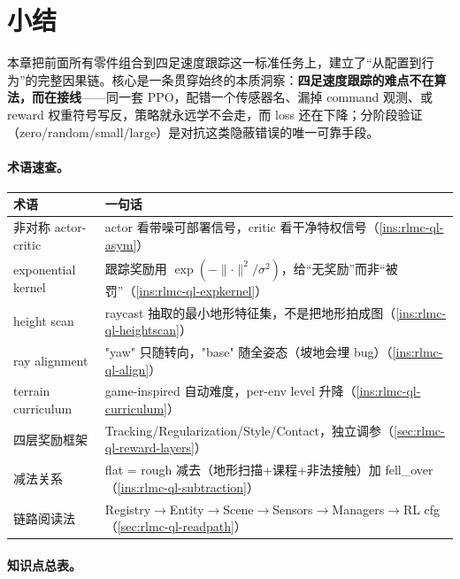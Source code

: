 \section{小结}
\label{sec:rlmc-ql-summary}

本章把前面所有零件组合到四足速度跟踪这一标准任务上，建立了“从配置到行为”的完整因果链。核心是一条贯穿始终的本质洞察：\textbf{四足速度跟踪的难点不在算法，而在接线}——同一套 PPO，配错一个传感器名、漏掉 command 观测、或 reward 权重符号写反，策略就永远学不会走，而 loss 还在下降；分阶段验证（zero/random/small/large）是对抗这类隐蔽错误的唯一可靠手段。

\paragraph{术语速查。}

\begin{center}
\small
\begin{tabular}{@{}ll@{}}
\toprule
术语 & 一句话 \\
\midrule
非对称 actor-critic & actor 看带噪可部署信号，critic 看干净特权信号（\cref{ins:rlmc-ql-asym}） \\
exponential kernel & 跟踪奖励用 $\exp(-\lVert\cdot\rVert^2/\sigma^2)$，给“无奖励”而非“被罚”（\cref{ins:rlmc-ql-expkernel}） \\
height scan & raycast 抽取的最小地形特征集，不是把地形拍成图（\cref{ins:rlmc-ql-heightscan}） \\
ray alignment & "yaw" 只随转向，"base" 随全姿态（坡地会埋 bug）（\cref{ins:rlmc-ql-align}） \\
terrain curriculum & game-inspired 自动难度，per-env level 升降（\cref{ins:rlmc-ql-curriculum}） \\
四层奖励框架 & Tracking/Regularization/Style/Contact，独立调参（\cref{sec:rlmc-ql-reward-layers}） \\
减法关系 & flat = rough 减去（地形扫描+课程+非法接触）加 fell\_over（\cref{ins:rlmc-ql-subtraction}） \\
链路阅读法 & Registry$\to$Entity$\to$Scene$\to$Sensors$\to$Managers$\to$RL cfg（\cref{sec:rlmc-ql-readpath}） \\
\bottomrule
\end{tabular}
\end{center}

\paragraph{知识点总表。}

